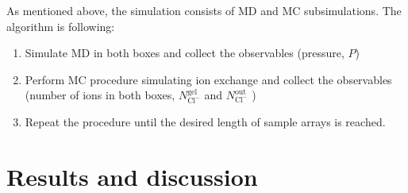 \documentclass[journal,article,submit,pdftex,moreauthors]{Definitions/mdpi}
\newcommand{\nna}{n_\mathrm{Na^+}}
\newcommand{\Ncl}{N_\mathrm{Cl^-}}
\newcommand{\gel}{^\mathrm{gel}}
\newcommand{\out}{^{\mathrm{out}}}
\begin{document}
As mentioned above, the simulation consists of MD and MC subsimulations. The algorithm is following:
\begin{enumerate}
\item Simulate MD in both boxes and collect the observables (pressure, $P$)
\item Perform MC procedure simulating ion exchange and collect the observables (number of ions in both boxes, 
$\Ncl\gel$ 
and $\Ncl\out$ )
\item Repeat the procedure until the desired length of sample arrays is reached.
\end{enumerate}

\section{Results and discussion}
\end{document}
